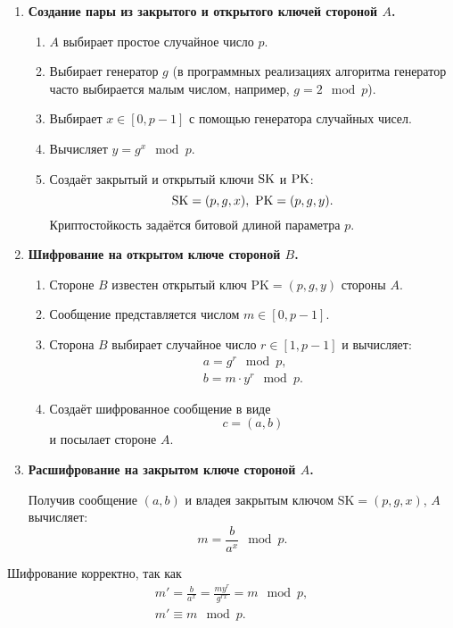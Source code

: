 \begin{enumerate}
    \item \textbf{Создание пары из закрытого и открытого ключей стороной $A$.}
        \begin{enumerate}
            \item $A$ выбирает простое случайное число $p$.
            \item Выбирает генератор $g$ (в программных реализациях алгоритма генератор часто выбирается малым числом, например, $g = 2 \mod p$).
            \item Выбирает $x \in [0, p - 1]$ с помощью генератора случайных чисел.
            \item Вычисляет $y=g^{x}\mod p$.
            \item Создаёт закрытый и открытый ключи $\textrm{SK}$ и $\textrm{PK}$:
                \[ \textrm{SK} = (p, g, x), ~ \textrm{PK} = (p, g, y). \]
                Криптостойкость задаётся битовой длиной параметра $p$.
        \end{enumerate}
    \item \textbf{Шифрование на открытом ключе стороной $B$.}
        \begin{enumerate}
            \item Стороне $B$ известен открытый ключ $\text{PK} = (p, g, y)$ стороны $A$.
            \item Сообщение представляется числом $m \in [0, p-1]$.
            \item Сторона $B$ выбирает случайное число $r \in [1, p-1]$ и вычисляет:
                \[ \begin{array}{l}
                    a = g^r \mod p, \\
                    b = m \cdot y^r \mod p.
                \end{array} \]
            \item Создаёт шифрованное сообщение в виде
                \[ c = (a, b) \]
                и посылает стороне $A$.
        \end{enumerate}
    \item \textbf{Расшифрование на закрытом ключе стороной $A$.}

	Получив сообщение $(a, b)$ и владея закрытым ключом $\text{SK} = (p, g, x)$, $A$ вычисляет:
                \[ m = \frac{b}{a^x} \mod p. \]
\end{enumerate}

Шифрование корректно, так как 
\[ \begin{array}{l}
    m' = \frac{b}{a^x} = \frac{m y^r}{g^{rx}} = m \mod p, \\
    m' \equiv m \mod p.
\end{array} \]

